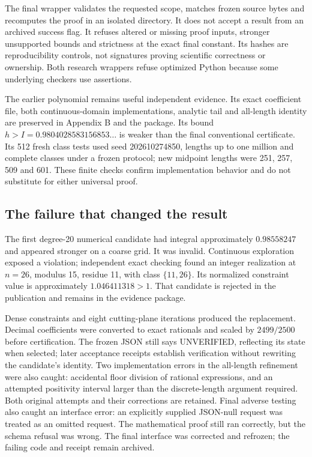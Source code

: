 \documentclass[11pt,a4paper]{article}
\renewcommand{\texttt}[1]{{\ttfamily\small #1}}
\begin{document}
The final wrapper validates the requested scope, matches frozen source
bytes and recomputes the proof in an isolated directory. It does not
accept a result from an archived success flag. It refuses altered or
missing proof inputs, stronger unsupported bounds and strictness at the
exact final constant. Its hashes are reproducibility controls, not
signatures proving scientific correctness or ownership. Both research
wrappers refuse optimized Python because some underlying checkers use
assertions.

The earlier polynomial remains useful independent evidence. Its exact
coefficient file, both continuous-domain implementations, analytic tail
and all-length identity are preserved in Appendix B and the package. Its
bound \(h>I=0.9804028583156853\ldots\) is weaker than the final
conventional certificate. Its 512 fresh class tests used seed
\texttt{202610274850}, lengths up to one million and complete classes
under a frozen protocol; new midpoint lengths were 251, 257, 509 and
601. These finite checks confirm implementation behavior and do not
substitute for either universal proof.


\hypertarget{the-failure-that-changed-the-result}{%
\subsection{The failure that changed the
result}\label{the-failure-that-changed-the-result}}

The first degree-20 numerical candidate had integral approximately
\(0.98558247\) and appeared stronger on a coarse grid. It was invalid.
Continuous exploration exposed a violation; independent exact checking
found an integer realization at \(n=26\), modulus 15, residue 11, with
class \(\{11,26\}\). Its normalized constraint value is approximately
\(1.046411318>1\). That candidate is rejected in the publication and
remains in the evidence package.

Dense constraints and eight cutting-plane iterations produced the
replacement. Decimal coefficients were converted to exact rationals and
scaled by \(2499/2500\) before certification. The frozen JSON still says
\texttt{UNVERIFIED}, reflecting its state when selected; later
acceptance receipts establish verification without rewriting the
candidate's identity. Two implementation errors in the all-length
refinement were also caught: accidental floor division of rational
expressions, and an attempted positivity interval larger than the
discrete-length argument required. Both original attempts and their
corrections are retained. Final adverse testing also caught an interface
error: an explicitly supplied JSON-null request was treated as an
omitted request. The mathematical proof still ran correctly, but the
schema refusal was wrong. The final interface was corrected and
refrozen; the failing code and receipt remain archived.
\end{document}
